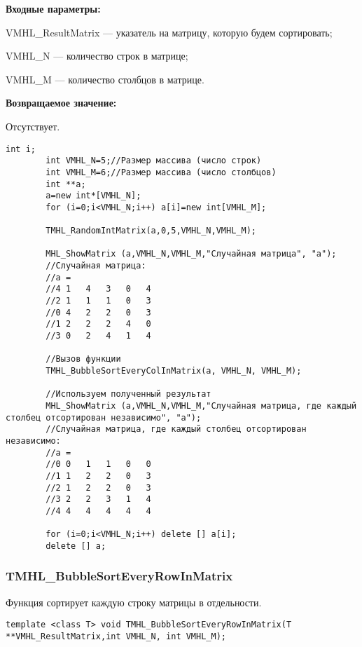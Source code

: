 \documentclass[a4paper,12pt]{article}
\begin{document}
\textbf{Входные параметры:}
 
VMHL\_ResultMatrix --- указатель на матрицу, которую будем сортировать;
 
VMHL\_N --- количество строк в матрице;
 
VMHL\_M --- количество столбцов в матрице.

\textbf{Возвращаемое значение:}

Отсутствует.


\begin{lstlisting}[label=code_use_TMHL_BubbleSortEveryColInMatrix,caption=Пример использования]
        int i;
        int VMHL_N=5;//Размер массива (число строк)
        int VMHL_M=6;//Размер массива (число столбцов)
        int **a;
        a=new int*[VMHL_N];
        for (i=0;i<VMHL_N;i++) a[i]=new int[VMHL_M];

        TMHL_RandomIntMatrix(a,0,5,VMHL_N,VMHL_M);

        MHL_ShowMatrix (a,VMHL_N,VMHL_M,"Случайная матрица", "a");
        //Случайная матрица:
        //a =
        //4	1	4	3	0	4
        //2	1	1	1	0	3
        //0	4	2	2	0	3
        //1	2	2	2	4	0
        //3	0	2	4	1	4

        //Вызов функции
        TMHL_BubbleSortEveryColInMatrix(a, VMHL_N, VMHL_M);

        //Используем полученный результат
        MHL_ShowMatrix (a,VMHL_N,VMHL_M,"Случайная матрица, где каждый столбец отсортирован независимо", "a");
        //Случайная матрица, где каждый столбец отсортирован независимо:
        //a =
        //0	0	1	1	0	0
        //1	1	2	2	0	3
        //2	1	2	2	0	3
        //3	2	2	3	1	4
        //4	4	4	4	4	4

        for (i=0;i<VMHL_N;i++) delete [] a[i];
        delete [] a;
\end{lstlisting}

\subsubsection{TMHL\_BubbleSortEveryRowInMatrix}\label{TMHL_BubbleSortEveryRowInMatrix}

Функция сортирует каждую строку матрицы в отдельности.


\begin{lstlisting}[label=code_syntax_TMHL_BubbleSortEveryRowInMatrix,caption=Синтаксис]
template <class T> void TMHL_BubbleSortEveryRowInMatrix(T **VMHL_ResultMatrix,int VMHL_N, int VMHL_M);
\end{lstlisting}
\end{document}
